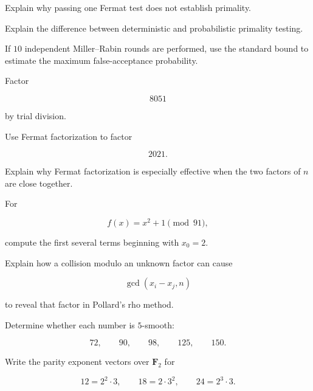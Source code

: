 \begin{exercise}[2]
Explain why passing one Fermat test does not establish primality.
\end{exercise}

\begin{exercise}[2]
Explain the difference between deterministic and probabilistic primality
testing.
\end{exercise}

\begin{exercise}[2]
If \(10\) independent Miller--Rabin rounds are performed, use the standard
bound to estimate the maximum false-acceptance probability.
\end{exercise}

\begin{exercise}[1]
Factor

\[ 8051 \]

by trial division.
\end{exercise}

\begin{exercise}[2]
Use Fermat factorization to factor

\[ 2021. \]
\end{exercise}

\begin{exercise}[2]
Explain why Fermat factorization is especially effective when the two factors
of \(n\) are close together.
\end{exercise}

\begin{exercise}[2]
For

\[ f(x)=x^2+1\pmod{91}, \]

compute the first several terms beginning with \(x_0=2\).
\end{exercise}

\begin{exercise}[3]
Explain how a collision modulo an unknown factor can cause

\[ \gcd(x_i-x_j,n) \]

to reveal that factor in Pollard's rho method.
\end{exercise}

\begin{exercise}[1]
Determine whether each number is \(5\)-smooth:

\[ 72,\qquad90,\qquad98,\qquad125,\qquad150. \]
\end{exercise}

\begin{exercise}[2]
Write the parity exponent vectors over \(\mathbf F_2\) for

\[ 12=2^2\cdot3,\qquad18=2\cdot3^2,\qquad24=2^3\cdot3. \]
\end{exercise}

